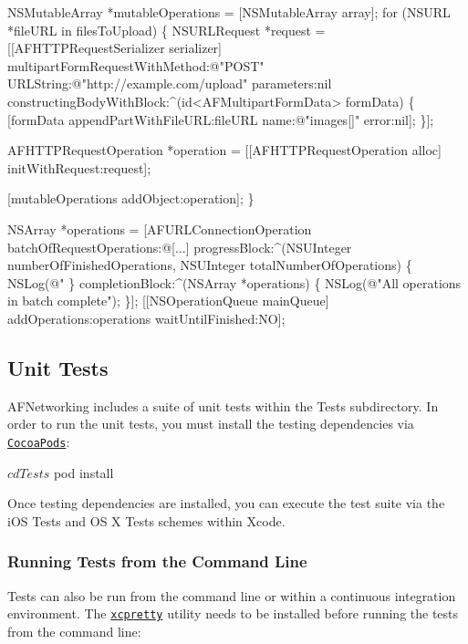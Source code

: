 \begin{DoxyCode}
NSMutableArray *mutableOperations = [NSMutableArray array];
for (NSURL *fileURL in filesToUpload) \{
    NSURLRequest *request = [[AFHTTPRequestSerializer serializer] multipartFormRequestWithMethod:@"POST"
       URLString:@"http://example.com/upload" parameters:nil constructingBodyWithBlock:^(id<AFMultipartFormData>
       formData) \{
        [formData appendPartWithFileURL:fileURL name:@"images[]" error:nil];
    \}];

    AFHTTPRequestOperation *operation = [[AFHTTPRequestOperation alloc] initWithRequest:request];

    [mutableOperations addObject:operation];
\}

NSArray *operations = [AFURLConnectionOperation batchOfRequestOperations:@[...] progressBlock:^(NSUInteger
       numberOfFinishedOperations, NSUInteger totalNumberOfOperations) \{
    NSLog(@"%
\} completionBlock:^(NSArray *operations) \{
    NSLog(@"All operations in batch complete");
\}];
[[NSOperationQueue mainQueue] addOperations:operations waitUntilFinished:NO];
\end{DoxyCode}


\subsection*{Unit Tests}

A\+F\+Networking includes a suite of unit tests within the Tests subdirectory. In order to run the unit tests, you must install the testing dependencies via \href{https://cocoapods.org/}{\tt Cocoa\+Pods}\+: \begin{DoxyVerb}$ cd Tests
$ pod install
\end{DoxyVerb}


Once testing dependencies are installed, you can execute the test suite via the \textquotesingle{}i\+OS Tests\textquotesingle{} and \textquotesingle{}OS X Tests\textquotesingle{} schemes within Xcode.

\subsubsection*{Running Tests from the Command Line}

Tests can also be run from the command line or within a continuous integration environment. The \href{https://github.com/supermarin/xcpretty}{\tt {\ttfamily xcpretty}} utility needs to be installed before running the tests from the command line\+: 


